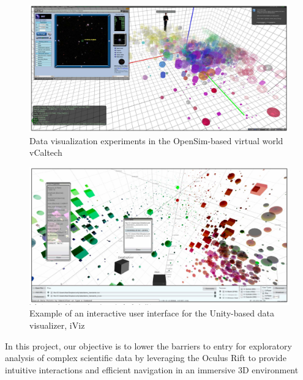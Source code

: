 \begin{figure}[h]
	\begin{center}
		\includegraphics[width=14cm]{03_Figures/05_LitReview/Donalek2014_Caltech.png}
		\caption[Data visualization experiments in the OpenSim-based virtual world vCaltech]{Data visualization experiments in the OpenSim-based virtual world vCaltech \citep{Donalek2014}}
		\label{fig:caltechsim}
	\end{center}
\end{figure}

\begin{figure}[h]
	\begin{center}
		\includegraphics[width=14cm]{03_Figures/05_LitReview/Donalek2014_iViz.png}
		\caption[Example of an interactive user interface for the Unity-based data visualizer, iViz]{Example of an interactive user interface for the Unity-based data visualizer, iViz \citep{Donalek2014}}
		\label{fig:iviz}
	\end{center}
\end{figure}


In this project, our objective is to lower the barriers to entry for exploratory analysis of complex scientific data by leveraging the Oculus Rift to provide intuitive interactions and efficient navigation in an immersive 3D environment
\cite{Drouhard2015}

